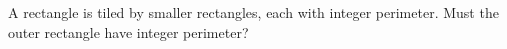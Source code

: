 A rectangle is tiled by smaller rectangles, each with integer perimeter. Must the outer rectangle have integer perimeter?
